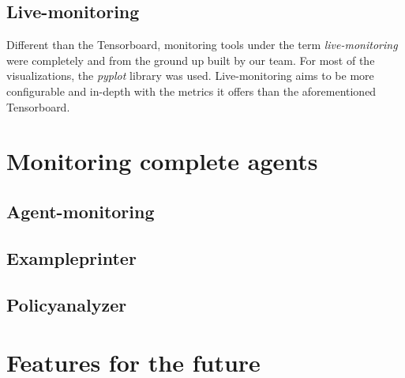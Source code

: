 \subsection{Live-monitoring}

Different than  the Tensorboard, monitoring tools  under the term \emph{live-monitoring} were completely and from the ground up built by our team. For most of the visualizations, the \emph{pyplot} library  was used. Live-monitoring aims to be more configurable and in-depth with the metrics it offers than the aforementioned Tensorboard.  

\section{Monitoring complete agents}

\subsection{Agent-monitoring}
\subsection{Exampleprinter}
\subsection{Policyanalyzer}

\section{Features for the future}